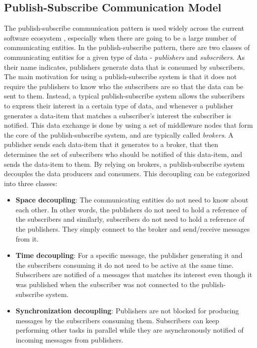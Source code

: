 \subsection{Publish-Subscribe Communication Model}
The publish-subscribe communication pattern is used widely across the current software ecosystem \cite{manyfaces}, especially when there are going to be a large number of communicating entities. In the publish-subscribe pattern, there are two classes of communicating entities for a given type of data - \textit{publishers} and \textit{subscribers}. As their name indicates, publishers generate data that is consumed by subscribers. The main motivation for using a publish-subscribe system is that it does not require the publishers to know who the subscribers are so that the data can be sent to them. Instead, a typical publish-subscribe system allows the subscribers to express their interest in a certain type of data, and whenever a publisher generates a data-item that matches a subscriber's interest the subscriber is notified. This data exchange is done by using a set of middleware nodes that form the core of the publish-subscribe system, and are typically called \textit{brokers}. A publisher sends each data-item that it generates to a broker, that then determines the set of subscribers who should be notified of this data-item, and sends the data-item to them. By relying on brokers, a publish-subscribe system decouples the data producers and consumers. This decoupling can be categorized into three classes:
\begin{itemize}
\item \textbf{Space decoupling}: The communicating entities do not need to know about each other. In other words, the publishers do not need to hold a reference of the subscribers and similarly, subscribers do not need to hold a reference of the publishers. They simply connect to the broker and send/receive messages from it.
\item \textbf{Time decoupling}: For a specific message, the publisher generating it and the subscribers consuming it do not need to be active at the same time. Subscribers are notified of a messages that matches its interest even though it was published when the subscriber was not connected to the publish-subscribe system.
\item \textbf{Synchronization decoupling}: Publishers are not blocked for producing messages by the subscribers consuming them. Subscribers can keep performing other tasks in parallel while they are asynchronously notified of incoming messages from publishers. 
\end{itemize}
